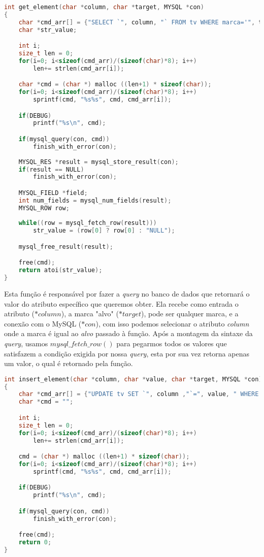 \begin{lstlisting}[language=c, caption={fun\c{c}\~{a}o $get\_element()$}, label={lst:dbphi2}]
int get_element(char *column, char *target, MYSQL *con)
{
	char *cmd_arr[] = {"SELECT `", column, "` FROM tv WHERE marca='", target, "'"};
	char *str_value;

	int i;
	size_t len = 0;
	for(i=0; i<sizeof(cmd_arr)/(sizeof(char)*8); i++)
		len+= strlen(cmd_arr[i]);

	char *cmd = (char *) malloc ((len+1) * sizeof(char));
	for(i=0; i<sizeof(cmd_arr)/(sizeof(char)*8); i++)
		sprintf(cmd, "%s%s", cmd, cmd_arr[i]);

	if(DEBUG)
		printf("%s\n", cmd);

	if(mysql_query(con, cmd))
		finish_with_error(con);
   
	MYSQL_RES *result = mysql_store_result(con);
	if(result == NULL)
		finish_with_error(con);

	MYSQL_FIELD *field;
	int num_fields = mysql_num_fields(result);
	MYSQL_ROW row;
	
	while((row = mysql_fetch_row(result)))
		str_value = (row[0] ? row[0] : "NULL");

	mysql_free_result(result);

	free(cmd);
	return atoi(str_value);
}
\end{lstlisting}

Esta fun\c{c}\~{a}o \'{e} respons\'{a}vel por fazer a \textit{query} no banco de dados que retornar\'{a} o valor do 
atributo espec\'{i}fico que queremos obter. Ela recebe como entrada o atributo (\textit{$*column$}), a marca "alvo" 
(\textit{$*target$}), pode ser qualquer marca, e a conex\~{a}o com o MySQL (\textit{$*con$}), com 
isso podemos selecionar o atributo \textit{column} onde a marca \'{e} igual ao \textit{alvo} passado \`{a} 
fun\c{c}\~{a}o. Ap\'{o}s a montagem da sintaxe da \textit{query}, usamos \textit{$mysql\_fetch\_row()$} para pegarmos 
todos os valores que satisfazem a condi\c{c}\~{a}o exigida por nossa \textit{query}, esta por sua vez retorna apenas 
um valor, o qual \'{e} retornado pela fun\c{c}\~{a}o.

\begin{lstlisting}[language=c, caption={fun\c{c}\~{a}o $insert\_element()$}, label={lst:dbphi3}]
int insert_element(char *column, char *value, char *target, MYSQL *con)
{
	char *cmd_arr[] = {"UPDATE tv SET `", column ,"`=", value, " WHERE marca='", target, "'"};
	char *cmd = "";

	int i;
	size_t len = 0;
	for(i=0; i<sizeof(cmd_arr)/(sizeof(char)*8); i++)
		len+= strlen(cmd_arr[i]);

	cmd = (char *) malloc ((len+1) * sizeof(char));
	for(i=0; i<sizeof(cmd_arr)/(sizeof(char)*8); i++)
		sprintf(cmd, "%s%s", cmd, cmd_arr[i]);

	if(DEBUG)
		printf("%s\n", cmd);

	if(mysql_query(con, cmd))
		finish_with_error(con);

	free(cmd);
	return 0;
}
\end{lstlisting}

